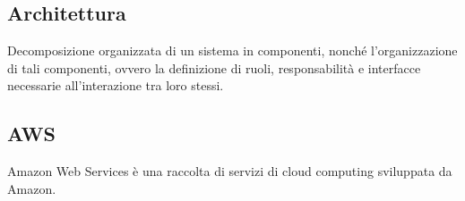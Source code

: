 \subsection{Architettura}
Decomposizione organizzata di un sistema in componenti, nonché l'organizzazione di tali componenti, ovvero la definizione di ruoli, responsabilità e interfacce necessarie all'interazione tra loro stessi.

\subsection{AWS}
Amazon Web Services è una raccolta di servizi di cloud computing sviluppata da Amazon.